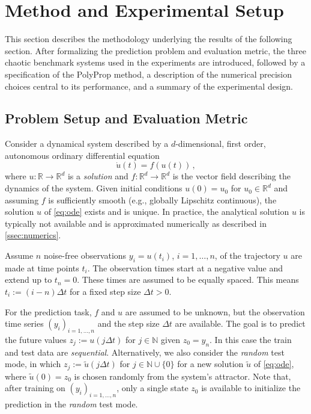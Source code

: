 \documentclass{article}
\newcommand{\N}{\mathbb{N}}
\newcommand{\R}{\mathbb{R}}
\newcommand{\eqcm}{\,,} %
\newcommand{\stepsize}{\Delta\!t}
\begin{document}
\section{Method and Experimental Setup}\label{sec:setup}

This section describes the methodology underlying the results of the following section. After formalizing the prediction problem and evaluation metric, the three chaotic benchmark systems used in the experiments are introduced, followed by a specification of the PolyProp method, a description of the numerical precision choices central to its performance, and a summary of the experimental design.
%
\subsection{Problem Setup and Evaluation Metric}\label{ssec:problem}
%
Consider a dynamical system described by a $d$-dimensional, first order, autonomous ordinary differential equation 
\begin{equation}\label{eq:ode}
    \dot u(t) = f(u(t))
    \eqcm
\end{equation}
where $u \colon \R\to\R^d$ is a \textit{solution} and $f \colon \R^d \to \R^d$ is the vector field describing the dynamics of the system. Given initial conditions $u(0) = u_0$ for $u_0 \in \R^d$ and assuming $f$ is sufficiently smooth (e.g., globally Lipschitz continuous), the solution $u$ of \cref{eq:ode} exists and is unique. In practice, the analytical solution $u$ is typically not available and is approximated numerically as described in \cref{ssec:numerics}.

Assume $n$ noise-free observations $y_i = u(t_i)$, $i = 1,\dots,n$, of the trajectory $u$ are made at time points $t_i$. The observation times start at a negative value and extend up to $t_n = 0$. These times are assumed to be equally spaced. This means $t_i := (i-n)\stepsize$ for a fixed step size $\stepsize > 0$.

For the prediction task, $f$ and $u$ are assumed to be unknown, but the observation time series $(y_i)_{i=1,\dots,n}$ and the step size $\stepsize$ are available. The goal is to predict the future values $z_j := u(j\stepsize)$ for $j \in \N$ given $z_0 = y_n$. In this case the train and test data are \textit{sequential}. Alternatively, we also consider the \textit{random} test mode, in which $z_j := \tilde u(j\stepsize)$ for $j \in \N \cup \{0\}$ for a new solution $\tilde u$ of \cref{eq:ode}, where $\tilde u(0) = z_0$ is chosen randomly from the system's attractor. Note that, after training on $(y_i)_{i=1,\dots,n}$, only a single state $z_0$ is available to initialize the prediction in the \textit{random} test mode.
\end{document}
